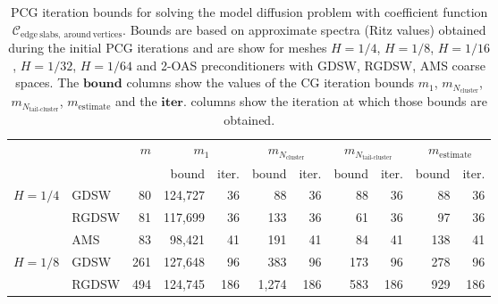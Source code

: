 \begin{table}[H]
\centering
\caption{PCG iteration bounds for solving the model diffusion problem with coefficient function $\mathcal{C}_{\mathrm{edge \ slabs, \ around \ vertices}}$. Bounds are based on approximate spectra (Ritz values) obtained during the initial PCG iterations and are show for meshes $H=1/4$, $H=1/8$, $H=1/16$, $H=1/32$, $H=1/64$ and 2-OAS preconditioners with GDSW, RGDSW, AMS coarse spaces. The $\textbf{bound}$ columns show the values of the CG iteration bounds $m_1$, $m_{N_{\text{cluster}}}$, $m_{N_{\text{tail-cluster}}}$, $m_{\text{estimate}}$ and the $\textbf{iter.}$ columns show the iteration at which those bounds are obtained.}
\label{tab:cg_iteration_bound_coef=slabs_around_vertices}
\begin{tabular}{llrrrrrrrrr}
\toprule
 &  & \bfseries $m$ & \multicolumn{2}{|c|}{\bfseries $m_1$} & \multicolumn{2}{|c|}{\bfseries $m_{N_{\text{cluster}}}$} & \multicolumn{2}{|c|}{\bfseries $m_{N_{\text{tail-cluster}}}$} & \multicolumn{2}{|c|}{\bfseries $m_{\text{estimate}}$} \\
 &  &  & bound & iter. & bound & iter. & bound & iter. & bound & iter. \\
\midrule
\multirow[c]{3}{*}{\bfseries $H=1/4$} & GDSW & 80 & {\cellcolor[HTML]{E2E4FB}} \color[HTML]{000000} 124,727 & 36 & {\cellcolor[HTML]{405FE5}} \color[HTML]{F1F1F1} 88 & 36 & {\cellcolor[HTML]{768BEC}} \color[HTML]{F1F1F1} 88 & 36 & {\cellcolor[HTML]{ACB8F4}} \color[HTML]{000000} 88 & 36 \\
\cline{2-11}
\bfseries  & RGDSW & 81 & {\cellcolor[HTML]{E2E4FB}} \color[HTML]{000000} 117,699 & 36 & {\cellcolor[HTML]{ACB8F4}} \color[HTML]{000000} 133 & 36 & {\cellcolor[HTML]{768BEC}} \color[HTML]{F1F1F1} 61 & 36 & {\cellcolor[HTML]{405FE5}} \color[HTML]{F1F1F1} 97 & 36 \\
\cline{2-11}
\bfseries  & AMS & 83 & {\cellcolor[HTML]{E2E4FB}} \color[HTML]{000000} 98,421 & 41 & {\cellcolor[HTML]{ACB8F4}} \color[HTML]{000000} 191 & 41 & {\cellcolor[HTML]{405FE5}} \color[HTML]{F1F1F1} 84 & 41 & {\cellcolor[HTML]{768BEC}} \color[HTML]{F1F1F1} 138 & 41 \\
\cline{1-11} \cline{2-11}
\multirow[c]{3}{*}{\bfseries $H=1/8$} & GDSW & 261 & {\cellcolor[HTML]{E2E4FB}} \color[HTML]{000000} 127,648 & 96 & {\cellcolor[HTML]{ACB8F4}} \color[HTML]{000000} 383 & 96 & {\cellcolor[HTML]{768BEC}} \color[HTML]{F1F1F1} 173 & 96 & {\cellcolor[HTML]{405FE5}} \color[HTML]{F1F1F1} 278 & 96 \\
\cline{2-11}
\bfseries  & RGDSW & 494 & {\cellcolor[HTML]{E2E4FB}} \color[HTML]{000000} 124,745 & 186 & {\cellcolor[HTML]{ACB8F4}} \color[HTML]{000000} 1,274 & 186 & {\cellcolor[HTML]{405FE5}} \color[HTML]{F1F1F1} 583 & 186 & {\cellcolor[HTML]{768BEC}} \color[HTML]{F1F1F1} 929 & 186 \\

\end{tabular}
\end{table}
